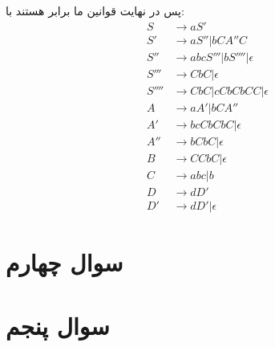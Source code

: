 \documentclass[]{article}
\begin{document}
پس در نهایت قوانین ما برابر هستند با:
\begin{align*}
    S &\rightarrow aS'\\
    S' &\rightarrow aS'' | bCA''C\\
    S'' &\rightarrow abcS''' | bS'''' | \epsilon\\
    S''' &\rightarrow CbC | \epsilon\\
    S'''' &\rightarrow CbC | cCbCbCC | \epsilon\\
    A  &\rightarrow aA' | bCA''\\
    A' &\rightarrow bcCbCbC | \epsilon\\
    A'' &\rightarrow bCbC | \epsilon\\
    B &\rightarrow CCbC | \epsilon\\
    C &\rightarrow abc | b\\
    D &\rightarrow dD'\\
    D' &\rightarrow dD' | \epsilon
\end{align*}
\section*{سوال چهارم}
\section*{سوال پنجم}
\end{document}
